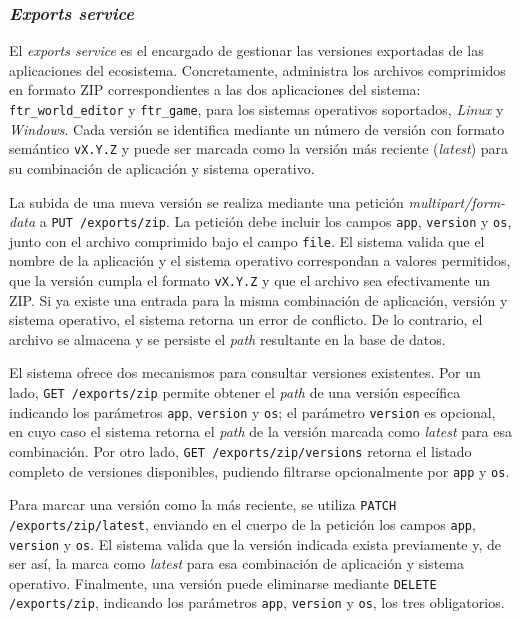 \subsubsection{\textit{Exports service}}
\label{sec:exports-service}

El \textit{exports service} es el encargado de gestionar las versiones exportadas de las aplicaciones del ecosistema.
Concretamente, administra los archivos comprimidos en formato ZIP correspondientes a las dos aplicaciones del sistema:
\texttt{ftr\_world\_editor} y \texttt{ftr\_game}, para los sistemas operativos soportados, \textit{Linux} y
\textit{Windows}. Cada versión se identifica mediante un número de versión con formato semántico \texttt{vX.Y.Z} y
puede ser marcada como la versión más reciente (\textit{latest}) para su combinación de aplicación y sistema operativo.
\vspace{0.25cm}

La subida de una nueva versión se realiza mediante una petición \textit{multipart/form-data} a
\texttt{PUT /exports/zip}. La petición debe incluir los campos \texttt{app}, \texttt{version} y \texttt{os}, junto
con el archivo comprimido bajo el campo \texttt{file}. El sistema valida que el nombre de la aplicación y el sistema
operativo correspondan a valores permitidos, que la versión cumpla el formato \texttt{vX.Y.Z} y que el archivo sea
efectivamente un ZIP. Si ya existe una entrada para la misma combinación de aplicación, versión y sistema operativo,
el sistema retorna un error de conflicto. De lo contrario, el archivo se almacena y se persiste el \textit{path}
resultante en la base de datos.
\vspace{0.25cm}

El sistema ofrece dos mecanismos para consultar versiones existentes. Por un lado, \texttt{GET /exports/zip} permite
obtener el \textit{path} de una versión específica indicando los parámetros \texttt{app}, \texttt{version} y
\texttt{os}; el parámetro \texttt{version} es opcional, en cuyo caso el sistema retorna el \textit{path} de la
versión marcada como \textit{latest} para esa combinación. Por otro lado, \texttt{GET /exports/zip/versions} retorna el 
listado completo de versiones disponibles, pudiendo filtrarse opcionalmente por \texttt{app} y \texttt{os}.
\vspace{0.25cm}

Para marcar una versión como la más reciente, se utiliza \texttt{PATCH /exports/zip/latest}, enviando en el cuerpo
de la petición los campos \texttt{app}, \texttt{version} y \texttt{os}. El sistema valida que la versión indicada
exista previamente y, de ser así, la marca como \textit{latest} para esa combinación de aplicación y sistema
operativo. Finalmente, una versión puede eliminarse mediante \texttt{DELETE /exports/zip}, indicando los parámetros 
\texttt{app}, \texttt{version} y \texttt{os}, los tres obligatorios.
\vspace{0.25cm}
